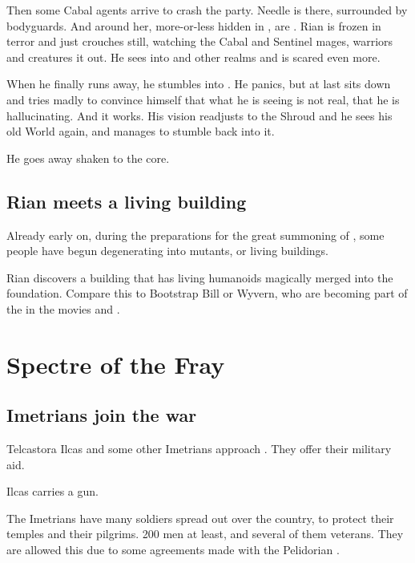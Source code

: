 Then some Cabal agents arrive to crash the party. 
Needle is there, surrounded by bodyguards. 
And around her, more-or-less hidden in \Nyx, are \banerats{}. 
Rian is frozen in terror and just crouches still, watching the Cabal and Sentinel mages, warriors and creatures \rayuth it out. 
He sees into \Nyx{} and other realms and is scared even more. 


When he finally runs away, he stumbles into \Nyx. 
He panics, but at last sits down and tries madly to convince himself that what he is seeing is not real, that he is hallucinating. 
And it works. 
His vision readjusts to the Shroud and he sees his old World again, and manages to stumble back into it. 

He goes away shaken to the core. 





\subsection{Rian meets a living building}
Already early on, during the preparations for the great summoning of \Nithd{}, some people have begun degenerating into mutants, or living buildings. 

Rian discovers a building that has living humanoids magically merged into the foundation. Compare this to Bootstrap Bill or Wyvern, who are becoming part of the  in the movies \cite{Movie:PiratesoftheCaribbean:II} and \cite{Movie:PiratesoftheCaribbean:III}. 












\section{Spectre of the Fray}








\subsection{Imetrians join the war}
Telcastora Ilcas and some other Imetrians approach \Tiroco. 
They offer their military aid. 

Ilcas carries a gun.

The Imetrians have many soldiers spread out over the country, to protect their temples and their pilgrims. 
200 men at least, and several of them veterans. 
They are allowed this due to some agreements made with the Pelidorian \rayuths. 

